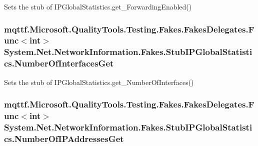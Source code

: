 Sets the stub of I\-P\-Global\-Statistics.\-get\-\_\-\-Forwarding\-Enabled()

\hypertarget{class_system_1_1_net_1_1_network_information_1_1_fakes_1_1_stub_i_p_global_statistics_ac22f22f3d5d828e609edb9da85550f2c}{
\subsubsection[{Number\-Of\-Interfaces\-Get}]{\setlength{\rightskip}{0pt plus 5cm}mqttf.\-Microsoft.\-Quality\-Tools.\-Testing.\-Fakes.\-Fakes\-Delegates.\-Func$<$int$>$ System.\-Net.\-Network\-Information.\-Fakes.\-Stub\-I\-P\-Global\-Statistics.\-Number\-Of\-Interfaces\-Get}}\label{class_system_1_1_net_1_1_network_information_1_1_fakes_1_1_stub_i_p_global_statistics_ac22f22f3d5d828e609edb9da85550f2c}


Sets the stub of I\-P\-Global\-Statistics.\-get\-\_\-\-Number\-Of\-Interfaces()

\hypertarget{class_system_1_1_net_1_1_network_information_1_1_fakes_1_1_stub_i_p_global_statistics_a7baeb7accbf4d3823338989ffa08d01c}{
\subsubsection[{Number\-Of\-I\-P\-Addresses\-Get}]{\setlength{\rightskip}{0pt plus 5cm}mqttf.\-Microsoft.\-Quality\-Tools.\-Testing.\-Fakes.\-Fakes\-Delegates.\-Func$<$int$>$ System.\-Net.\-Network\-Information.\-Fakes.\-Stub\-I\-P\-Global\-Statistics.\-Number\-Of\-I\-P\-Addresses\-Get}}\label{class_system_1_1_net_1_1_network_information_1_1_fakes_1_1_stub_i_p_global_statistics_a7baeb7accbf4d3823338989ffa08d01c}


